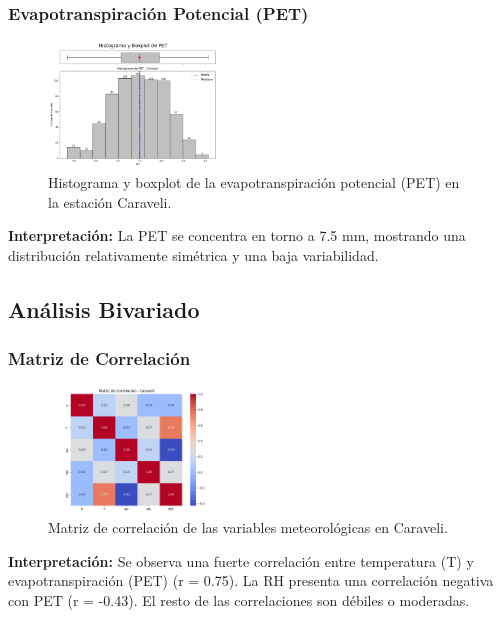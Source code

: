 \subsubsection*{Evapotranspiración Potencial (PET)}
\begin{figure}[H]
\centering
\includegraphics[width=0.4\textwidth]{resultados/por_estacion_meteorologica/Caraveli/PET_histograma.png}
\caption{Histograma y boxplot de la evapotranspiración potencial (PET) en la estación Caraveli.}
\label{fig:caraveli_PET}
\end{figure}
\textbf{Interpretación:} La PET se concentra en torno a 7.5 mm, mostrando una distribución relativamente simétrica y una baja variabilidad.

\subsection{Análisis Bivariado}

\subsubsection*{Matriz de Correlación}
\begin{figure}[H]
\centering
\includegraphics[width=0.4\textwidth]{resultados/por_estacion_meteorologica/Caraveli/matriz_correlacion.png}
\caption{Matriz de correlación de las variables meteorológicas en Caraveli.}
\label{fig:caraveli_corr}
\end{figure}
\textbf{Interpretación:} Se observa una fuerte correlación entre temperatura (T) y evapotranspiración (PET) (r = 0.75). La RH presenta una correlación negativa con PET (r = -0.43). El resto de las correlaciones son débiles o moderadas.

